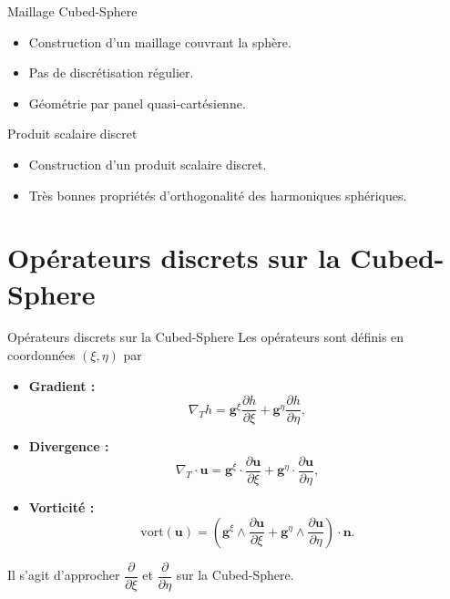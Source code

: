 \documentclass[11pt]{beamer}
\begin{document}
\begin{frame}{}
\begin{block}{Maillage Cubed-Sphere}
\begin{itemize}
\item Construction d'un maillage couvrant la sphère.
\item Pas de discrétisation régulier.
\item Géométrie par panel quasi-cartésienne.
\end{itemize}
\end{block}

\begin{block}{Produit scalaire discret}
\begin{itemize}
\item Construction d'un produit scalaire discret.
\item Très bonnes propriétés d'orthogonalité des harmoniques sphériques.
\end{itemize}
\end{block}
\end{frame}






\section{Opérateurs discrets sur la Cubed-Sphere}
\begin{frame}{Opérateurs discrets sur la Cubed-Sphere}
Les opérateurs sont définis en coordonnées $(\xi,\eta)$ par
\begin{block}{}
\begin{itemize}
\item \textbf{Gradient :}
$$
\nabla_T h = \mathbf{g}^{\xi} \dfrac{\partial h}{\partial \xi} + \mathbf{g}^{\eta} \dfrac{\partial h}{\partial \eta},
$$
\item \textbf{Divergence :}
$$
\nabla_T \cdot \mathbf{u} = \mathbf{g}^{\xi} \cdot \dfrac{\partial \mathbf{u}}{\partial \xi} + \mathbf{g}^{\eta} \cdot \dfrac{\partial \mathbf{u}}{\partial \eta},
$$
\item \textbf{Vorticité :}
$$
\text{vort}(\mathbf{u}) = \left( \mathbf{g}^{\xi} \wedge \dfrac{\partial \mathbf{u}}{\partial \xi} + \mathbf{g}^{\eta} \wedge \dfrac{\partial \mathbf{u}}{\partial \eta} \right) \cdot \mathbf{n}.
$$
\end{itemize}
\end{block}
Il s'agit d'approcher $\dfrac{\partial}{\partial \xi}$ et $\dfrac{\partial}{\partial \eta}$ sur la Cubed-Sphere.
\end{frame}
\end{document}
